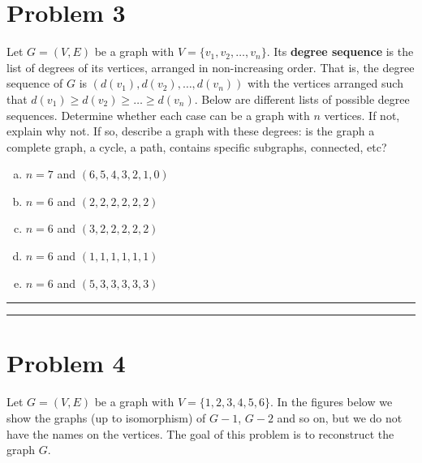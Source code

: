 \documentclass{article}
\theoremstyle{definition}
\newenvironment{solution}{\bigskip\hrule{\hfill}}{\bigskip\hrule{\hfill}} %
\begin{document}

\newpage


\section*{Problem 3}
Let $G=(V, E)$ be a graph with $V=\{v_1, v_2, \dots, v_n\}$. Its \textbf{degree sequence} is the list of degrees of its vertices, arranged in non-increasing order. That is, the degree sequence of $G$ is $(d(v_1), d(v_2), \dots, d(v_n))$ with the vertices arranged such that $d(v_1)\geq  d(v_2) \geq \dots \geq d(v_n)$. Below are different lists of possible degree sequences. Determine whether each case can be a graph with $n$ vertices. If not, explain why not. If so, describe a graph with these degrees: is the graph a complete graph, a cycle, a path, contains specific subgraphs, connected, etc?
	\begin{enumerate}[a)] %
		\item $n=7$ and $(6, 5, 4, 3, 2, 1, 0)$
		\item $n=6$ and $(2, 2, 2, 2, 2, 2)$
		\item $n=6$ and $(3, 2, 2, 2, 2, 2)$
		\item $n=6$ and $(1, 1, 1, 1, 1, 1)$
		\item $n=6$ and $(5, 3, 3, 3, 3, 3)$
    \end{enumerate}
\begin{solution}


\end{solution}


\newpage


\section*{Problem 4}
Let $G=\left(V,E\right)$ be a graph with $V=\{1,2,3,4,5,6\}$. In the figures below we show the graphs (up to isomorphism) of $G-1$, $G-2$ and so on, but we do not have the names on the vertices. The goal of this problem is to reconstruct the graph $G$.
\end{document}
